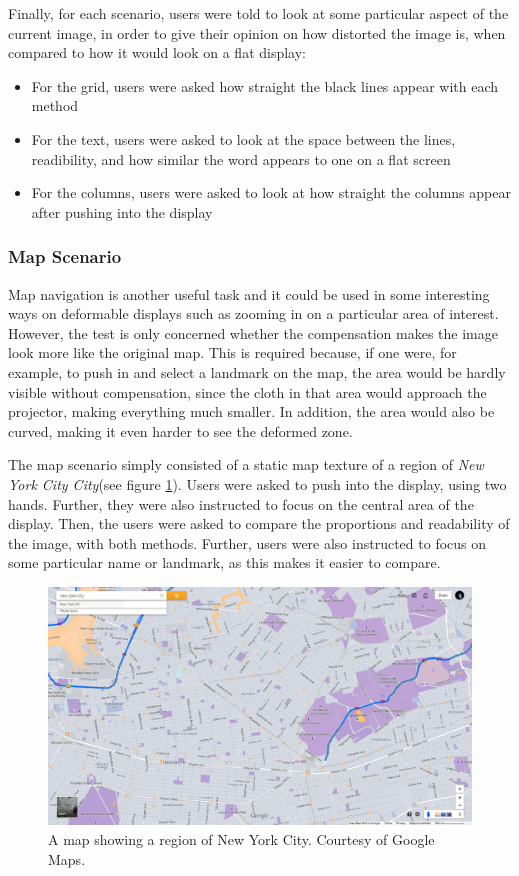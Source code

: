 \documentclass[]{article}
\begin{document}
Finally, for each scenario, users were told to look at some particular aspect of the current image, in order to give their opinion on how distorted the image is, when compared to how it would look on a flat display:
\begin{itemize}
\item For the grid, users were asked how straight the black lines appear with each method
\item For the text, users were asked to look at the space between the lines, readibility, and how similar the word appears to one on a flat screen
\item For the columns, users were asked to look at how straight the columns appear after pushing into the display
\end{itemize}

\subsubsection{Map Scenario}

Map navigation is another useful task and it could be used in some interesting ways on deformable displays such as zooming in on a particular area of interest. However, the test is only concerned whether the compensation makes the image look more like the original map.  This is required because, if one were, for example, to push in and select a landmark on the map, the area would be hardly visible without compensation, since the cloth in that area would approach the projector, making everything much smaller. In addition, the area would also be curved, making it even harder to see the deformed zone.

The map scenario simply consisted of a static map texture of a region of \textit{New York City City}(see figure \ref{fig:Map}). Users were asked to push into the display, using two hands. Further, they were also instructed to focus on the central area of the display. Then, the users were asked to compare the proportions and readability of the image, with both methods. Further, users were also instructed to focus on some particular name or landmark, as this makes it easier to compare.


\begin{figure}[!hbtp]
    \centering
    \includegraphics[width=1.0\textwidth]{figures/NYMidZoomA.jpg}
    \caption{A map showing a region of New York City. Courtesy of Google Maps.}
    \label{fig:Map}
\end{figure}
\end{document}
